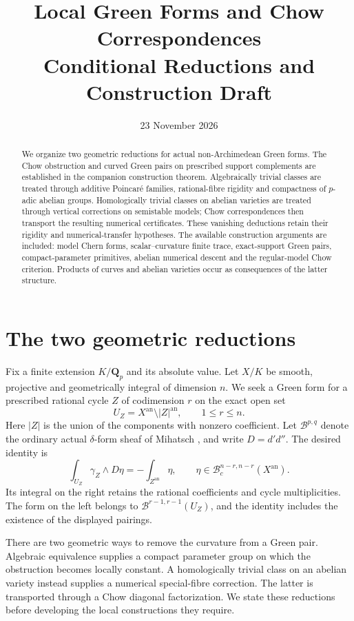 \documentclass[11pt]{article}
\title{Local Green Forms and Chow Correspondences\\Conditional Reductions and Construction Draft}
\author{}
\date{23 November 2026}
\theoremstyle{definition}
\theoremstyle{remark}
\numberwithin{equation}{section}
\newcommand{\an}{\mathrm{an}}
\newcommand{\B}{\mathcal B}
\begin{document}
\maketitle
\begin{abstract}
We organize two geometric reductions for actual non-Archimedean Green forms. The Chow obstruction and curved Green pairs on prescribed support complements are established in the companion construction theorem. Algebraically trivial classes are treated through additive Poincar\'e families, rational-fibre rigidity and compactness of $p$-adic abelian groups. Homologically trivial classes on abelian varieties are treated through vertical corrections on semistable models; Chow correspondences then transport the resulting numerical certificates. These vanishing deductions retain their rigidity and numerical-transfer hypotheses. The available construction arguments are included: model Chern forms, scalar--curvature finite trace, exact-support Green pairs, compact-parameter primitives, abelian numerical descent and the regular-model Chow criterion. Products of curves and abelian varieties occur as consequences of the latter structure.
\end{abstract}

\tableofcontents

\section{The two geometric reductions}\label{sec:construction-introduction}

Fix a finite extension $K/\mathbf Q_p$ and its absolute value. Let $X/K$ be smooth, projective and geometrically integral of dimension $n$. We seek a Green form for a prescribed rational cycle $Z$ of codimension $r$ on the exact open set
\[
 U_Z=X^{\an}\setminus |Z|^{\an},\qquad 1\le r\le n.
\]
Here $|Z|$ is the union of the components with nonzero coefficient. Let $\B^{p,q}$ denote the ordinary actual $\delta$-form sheaf of Mihatsch \cite{M}, and write $D=d'd''$. The desired identity is
\begin{equation}\label{eq:main-green}
 \int_{U_Z}\gamma_Z\wedge D\eta
 =-\int_{Z^{\an}}\eta,
 \qquad \eta\in\B_c^{n-r,n-r}(X^{\an}).
\end{equation}
Its integral on the right retains the rational coefficients and cycle multiplicities. The form on the left belongs to $\B^{r-1,r-1}(U_Z)$, and the identity includes the existence of the displayed pairings.

There are two geometric ways to remove the curvature from a Green pair. Algebraic equivalence supplies a compact parameter group on which the obstruction becomes locally constant. A homologically trivial class on an abelian variety instead supplies a numerical special-fibre correction. The latter is transported through a Chow diagonal factorization. We state these reductions before developing the local constructions they require.
\end{document}
